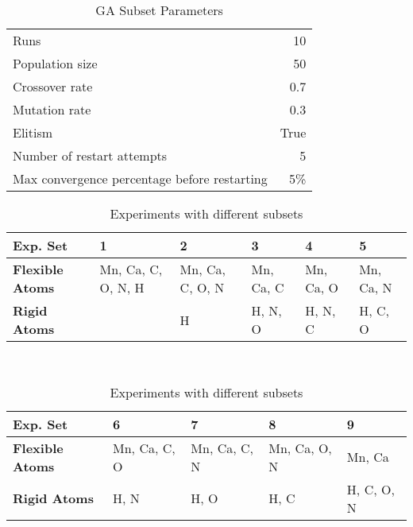 \begin{table}
	\centering
	\begin{tabular}{ l r }
		\hline
		Runs & 10 \\
		Population size & 50 \\
		Crossover rate & 0.7 \\
		Mutation rate & 0.3 \\
		Elitism & True \\
		Number of restart attempts & 5 \\
		Max convergence percentage before restarting & 5\% \\
		\hline
	\end{tabular}
	\caption{GA Subset Parameters}
	\label{table:subset-parameters}
\end{table}

\begin{table}
	\centering
	\begin{tabular}{ | >{\bfseries}p{2cm} | p{1cm} | p{1cm} | p{1cm} | p{1cm} | p{1cm} | }
		\hline
		Exp. Set & 1 & 2 & 3 & 4 & 5 \\ \hline
		Flexible Atoms & Mn, Ca, C, O, N, H & Mn, Ca, C, O, N & Mn, Ca, C & Mn, Ca, O & Mn, Ca, N \\ \hline
		Rigid Atoms &  & H & H, N, O & H, N, C & H, C, O \\ \hline
	\end{tabular}
	\\
	\vspace{3 mm}
	\begin{tabular}{ | >{\bfseries}p{2cm} | p{1cm} | p{1cm} | p{1cm} | p{1cm} | }
		\hline
		Exp. Set & 6 & 7 & 8 & 9 \\ \hline
		Flexible Atoms & Mn, Ca, C, O & Mn, Ca, C, N & Mn, Ca, O, N & Mn, Ca \\ \hline
		Rigid Atoms & H, N & H, O & H, C & H, C, O, N \\ \hline
	\end{tabular}
	\caption{Experiments with different subsets}
	\label{table:subset-setup}
\end{table}